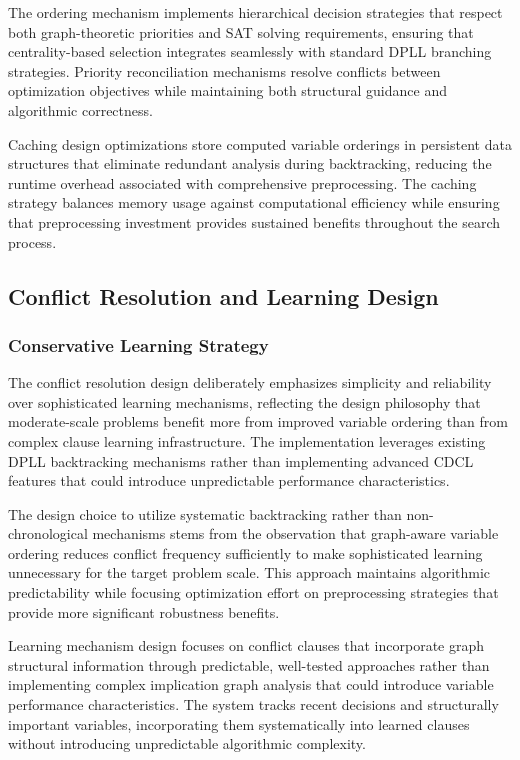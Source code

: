 The ordering mechanism implements hierarchical decision strategies that respect both graph-theoretic priorities and SAT solving requirements, ensuring that centrality-based selection integrates seamlessly with standard DPLL branching strategies. Priority reconciliation mechanisms resolve conflicts between optimization objectives while maintaining both structural guidance and algorithmic correctness.

Caching design optimizations store computed variable orderings in persistent data structures that eliminate redundant analysis during backtracking, reducing the runtime overhead associated with comprehensive preprocessing. The caching strategy balances memory usage against computational efficiency while ensuring that preprocessing investment provides sustained benefits throughout the search process.

\subsection{Conflict Resolution and Learning Design}

\subsubsection{Conservative Learning Strategy}

The conflict resolution design deliberately emphasizes simplicity and reliability over sophisticated learning mechanisms, reflecting the design philosophy that moderate-scale problems benefit more from improved variable ordering than from complex clause learning infrastructure. The implementation leverages existing DPLL backtracking mechanisms rather than implementing advanced CDCL features that could introduce unpredictable performance characteristics.

The design choice to utilize systematic backtracking rather than non-chronological mechanisms stems from the observation that graph-aware variable ordering reduces conflict frequency sufficiently to make sophisticated learning unnecessary for the target problem scale. This approach maintains algorithmic predictability while focusing optimization effort on preprocessing strategies that provide more significant robustness benefits.

Learning mechanism design focuses on conflict clauses that incorporate graph structural information through predictable, well-tested approaches rather than implementing complex implication graph analysis that could introduce variable performance characteristics. The system tracks recent decisions and structurally important variables, incorporating them systematically into learned clauses without introducing unpredictable algorithmic complexity.

